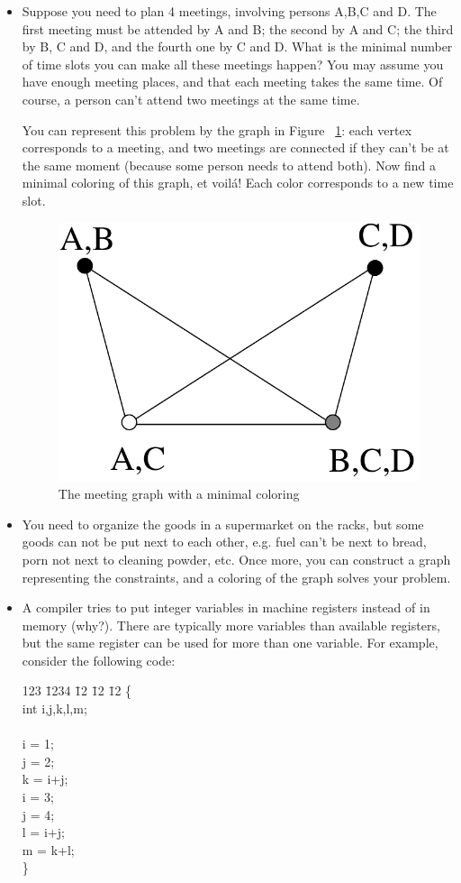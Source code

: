 \begin{itemize}
\item
Suppose you need to plan 4 meetings, involving persons A,B,C and D. The
first meeting must be attended by A and B; the second by A and C; the
third by B, C and D, and the fourth one by C and D. What is the
minimal number of time slots you can make all these meetings happen?
You may assume you have enough meeting places, and that each meeting
takes the same time. Of course, a person can't attend two meetings at
the same time.

You can represent this problem by the graph in Figure~
\ref{planning1}: each vertex corresponds to a meeting, and two
meetings are connected if they can't be at the same moment (because
some person needs to attend both). Now find a minimal coloring of this
graph, et voil\'{a}! Each color corresponds to a new time slot.
\begin{figure}[ht]
\begin{center}
\includegraphics[width=0.2\linewidth,keepaspectratio]{planning1}
\end{center}
\caption{The meeting graph with a minimal coloring\label{planning1}}
\end{figure}

\item
You need to organize the goods in a supermarket on the racks, but some
goods can not be put next to each other, e.g. fuel can't be next to
bread, porn not next to cleaning powder, etc. Once more, you can
construct a graph representing the constraints, and a coloring of the
graph solves your problem.

\item
A compiler tries to put integer variables in machine registers
instead of in memory (why?). There are typically more variables than
available registers, but the same register can be used for more than
one variable. For example, consider the following code:


\parbox{9cm}{
\begin{tabbing}
123 \= 1234 \= 12 \= 12 \= 12 \kill
\> \> \{\\
\> \> \> int i,j,k,l,m;\\
\\
\> \> \> i = 1;\\
\> \> \> j = 2;\\
\> \> \> k = i+j;\\
\> \> \> i = 3;\\
\> \> \> j = 4;\\
\> \> \> l = i+j;\\
\> \> \> m = k+l;\\
\> \> \}
\end{tabbing}
}\\


\end{itemize}
